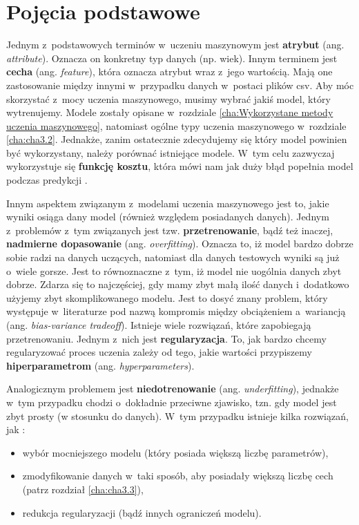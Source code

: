 \section{Pojęcia podstawowe}
\label{cha:pojecia}

Jednym z~podstawowych terminów w~uczeniu maszynowym jest \textbf{atrybut} (ang. \textit{attribute}). Oznacza on konkretny typ danych (np. wiek). Innym terminem jest \textbf{cecha} (ang. \textit{feature}), która oznacza atrybut wraz z~jego wartością. Mają one zastosowanie między innymi w~przypadku danych w~postaci plików csv. Aby móc skorzystać z~mocy uczenia maszynowego, musimy wybrać jakiś model, który wytrenujemy. Modele zostały opisane w~rozdziale \ref{cha:Wykorzystane metody uczenia maszynowego}, natomiast ogólne typy uczenia maszynowego w~rozdziale \ref{cha:cha3.2}. Jednakże, zanim ostatecznie zdecydujemy się który model powinien być wykorzystany, należy porównać istniejące modele. W~tym celu zazwyczaj wykorzystuje się \textbf{funkcję kosztu}, która mówi nam jak duży błąd popełnia model podczas predykcji \cite{Sawka18}. 

Innym aspektem związanym z~modelami uczenia maszynowego jest to, jakie wyniki osiąga dany model (również względem posiadanych danych). Jednym z~problemów z~tym związanych jest tzw. \textbf{przetrenowanie}, bądź też inaczej, \textbf{nadmierne dopasowanie} (ang. \textit{overfitting}). Oznacza to, iż model bardzo dobrze sobie radzi na danych uczących, natomiast dla danych testowych wyniki są już o~wiele gorsze. Jest to równoznaczne z~tym, iż model nie uogólnia danych zbyt dobrze. Zdarza się to najczęściej, gdy mamy zbyt małą ilość danych i~dodatkowo użyjemy zbyt skomplikowanego modelu. Jest to dosyć znany problem, który występuje w~literaturze pod nazwą kompromis między obciążeniem a~wariancją (ang. \textit{bias-variance tradeoff}). Istnieje wiele rozwiązań, które zapobiegają przetrenowaniu. Jednym z~nich jest \textbf{regularyzacja}. To, jak bardzo chcemy regularyzować proces uczenia zależy od tego, jakie wartości przypiszemy \textbf{hiperparametrom} (ang. \textit{hyperparameters}). 

Analogicznym problemem jest \textbf{niedotrenowanie} (ang. \textit{underfitting}), jednakże w~tym przypadku chodzi o~dokładnie przeciwne zjawisko, tzn. gdy model jest zbyt prosty (w stosunku do danych). W~tym przypadku istnieje kilka rozwiązań, jak \cite{Sawka18}:
\begin{itemize}
\item
wybór mocniejszego modelu (który posiada większą liczbę parametrów),
\item
zmodyfikowanie danych w~taki sposób, aby posiadały większą liczbę cech (patrz rozdział \ref{cha:cha3.3}),
\item
redukcja regularyzacji (bądź innych ograniczeń modelu).
\end{itemize} 
  
